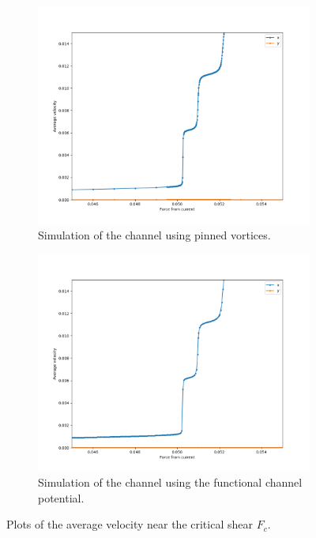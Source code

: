 \documentclass{article}
\numberwithin{equation}{section}
\begin{document}
\begin{figure}[htb]
\centering
\begin{subfigure}[t]{.49\textwidth}
    \centering
    \includegraphics[width=.9\linewidth]{results/Figures/Width1_velocities_Fc.png}
    \caption{Simulation of the channel using pinned vortices.}
    \label{fig:fc_vels_channel}
\end{subfigure}
\hfill
\begin{subfigure}[t]{.49\textwidth}
    \centering
\includegraphics[width=.9\linewidth]{results/Figures/Width1_velocities_analytic_Fc.png}
    \caption{Simulation of the channel using the functional channel potential.}
    \label{fig:fc_vels_analytic}
\end{subfigure}
\caption{Plots of the average velocity near the critical shear $F_c$.}
\label{fig:fc_vels}
\end{figure}
\end{document}
